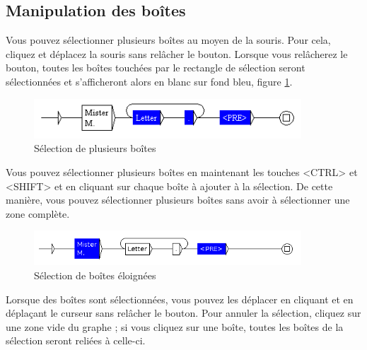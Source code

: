 
\subsection{Manipulation des boîtes}

Vous pouvez sélectionner plusieurs boîtes au moyen de la souris. Pour cela, cliquez et
déplacez la souris sans relâcher le bouton. Lorsque vous relâcherez le bouton, toutes les
boîtes touchées par le rectangle de sélection seront sélectionnées et s’afficheront alors en
blanc sur fond bleu, figure \ref{multi-selection}.

\begin{figure}[!ht]
\begin{center}
\includegraphics[width=10cm]{resources/img/fig5-13.png}
\caption{Sélection de plusieurs boîtes\label{multi-selection}}
\end{center}
\end{figure}
\vspace{-0.3cm}
\noindent Vous pouvez sélectionner plusieurs boîtes en maintenant les touches <CTRL> et <SHIFT> et
en cliquant sur chaque boîte à ajouter à la sélection. De cette manière, vous pouvez sélectionner
plusieurs boîtes sans avoir à sélectionner une zone complète.

\begin{figure}[!ht]
\begin{center}
\includegraphics[width=10cm]{resources/img/fig5-13b.png}
\caption{Sélection de boîtes éloignées\label{multi-selection2}}
\end{center}
\end{figure}
\vspace{-0.3cm}


\bigskip
\noindent Lorsque des boîtes sont sélectionnées, vous pouvez les déplacer en cliquant et en déplaçant le curseur sans relâcher le bouton. Pour annuler la sélection, cliquez sur une zone vide
du graphe ; si vous cliquez sur une boîte, toutes les boîtes de la sélection seront reliées à
celle-ci.

